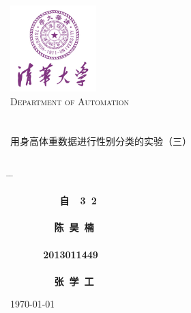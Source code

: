 


\begin{titlepage}
\begin{center}
\includegraphics[width=0.25\textwidth]{resource/logo.jpg}\\[1cm]
\textsc{\LARGE Department of Automation}\\[1.5cm]
\\[0.5cm]
\hrulefill
\\[0.8cm]{\centering \huge \hei 用身高体重数据进行性别分类的实验（三）}\\[0.4cm]
\hrulefill
\\[4cm]

\begin{tabbing}       %

 \hspace*{5cm} \= \hspace{2.6cm} \= \kill

\>  {\centering\fs\sihao\textbf{~~~~~~~~~自~~3~2}} \\
\\
\>  {\centering\fs\sihao\textbf{~~~~~~~~陈~昊~楠}}\\
\\
\>  {\centering\fs\sihao\textbf{~~~~~~2013011449}}\\
\\
\>  {\centering\fs\sihao\textbf{~~~~~~~~张~学~工}} \\

\end{tabbing}
\vfill
{\large \today}
\end{center}
\end{titlepage}

